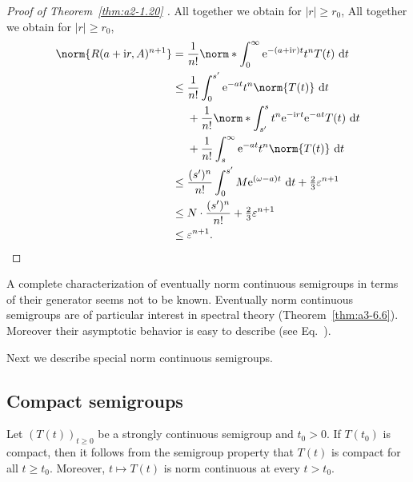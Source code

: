 \begin{proof}[Proof of Theorem~\ref{thm:a2-1.20}  ]
All together we obtain for $|r| \geq r_{0}$,
All together we obtain for $\lvert r\rvert \geq r_{0}$,
\begin{align*}
  \norm{R(a + \iu r,A)^{n+1}}
    &= \frac{1}{n!}
       \norm*{\int_0^\infty \eu^{-(a + \iu r)t} t^n T(t)\,\dt} \\
    &\leq \frac{1}{n!}\int_{0}^{s'} \eu^{-at} t^n \norm{T(t)}\,\dt \\
    &\phantom{{}\leq{}}
       + \frac{1}{n!}
         \norm*{\int_{s'}^{s} t^n \eu^{-\iu rt} \eu^{-at} T(t)\,\dt} \\
    &\phantom{{}\leq{}}
       + \frac{1}{n!}\int_{s}^{\infty} \eu^{-at} t^n \norm{T(t)}\,\dt \\
    &\leq \frac{(s')^{n}}{n!}\int_{0}^{s'} M \eu^{(\omega - a)t}\,\dt
          + \tfrac{2}{3}\epsilon^{n+1} \\
    &\leq N \cdot \frac{(s')^n}{n!} + \tfrac{2}{3}\epsilon^{n+1} \\
   &\leq \epsilon^{n+1}. \tag*{\qedsymbol}%
\end{align*}
\let\qedsymbol\relax
\end{proof}
A complete characterization of eventually norm continuous semigroups in terms of their generator seems not to be known.
Eventually norm continuous semigroups are of particular interest in spectral theory (\cf Theorem~\ref{thm:a3-6.6}).
Moreover their asymptotic behavior is easy to describe (see Eq.~).

Next we describe special norm continuous semigroups.
\subsection{Compact semigroups} \label{subsec:a2-1.se7}%
Let $(T(t))_{t\geq 0}$ be a strongly continuous semigroup and $t_0 > 0$.
If\/ $T(t_0)$ is compact, then it follows from the semigroup property that $T(t)$ is compact for all $t \geq t_0$.
Moreover, $t \mapsto T(t)$ is norm continuous at every $t > t_0$.

